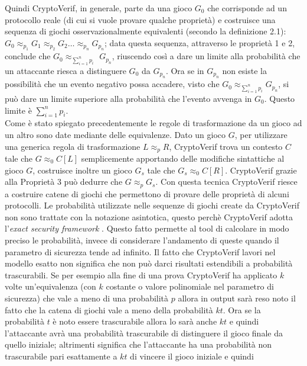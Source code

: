 \documentclass[a4paper,openright,twoside,12pt]{report}
\begin{document}
Quindi CryptoVerif, in generale, parte da una gioco $G_0$ che corrisponde ad un protocollo reale (di cui si vuole provare qualche propriet\`a) e costruisce una sequenza di giochi 
osservazionalmente equivalenti (secondo la definizione 2.1): $G_0 \approx_{p_1} G_1 \approx_{p_2} G_2 \dots \approx_{p_n} G_{p_{n}} $; data questa sequenza, 
attraverso le propriet\`a 1 e 2, conclude che $G_0  \approx_{\sum_{i=1}^{n}{p_i}}$ $G_{p_{n}} $, riuscendo cos\`i a dare un limite alla probabilit\`a che un attaccante riesca a distinguere
$G_0$ da $G_{p_{n}}$. Ora se in $G_{p_{n}}$ non esiste la possibilit\`a che un evento negativo possa accadere, visto che $G_0  \approx_{\sum_{i=1}^{n}{p_i}} G_{p_{n}} $, si pu\`o dare un limite superiore alla probabilit\`a che l'evento avvenga in $G_0$.
Questo limite \`e $\sum_{i=1}^{n}p_i$.\\Come \`e stato spiegato precedentemente le regole di trasformazione da un gioco ad un altro sono date mediante delle equivalenze. 
Dato un gioco $G$, per utilizzare una generica regola di trasformazione  $L \approx_p R$, CryptoVerif trova un contesto $C$ tale che $G \approx_0 C[L] $ semplicemente 
apportando delle modifiche sintattiche al gioco $G$, costruisce inoltre un gioco $G_s$ tale che $G_s \approx_0 C[R]$. CryptoVerif grazie alla Propriet\`a 3 pu\`o dedurre che $G \approx_p G_s$. 
Con questa tecnica CryptoVerif riesce a costruire catene
di giochi che permettono di provare delle propriet\`a di alcuni protocolli.
Le probabilit\`a utilizzate nelle sequenze di giochi create da CryptoVerif non sono trattate con la notazione asintotica, questo perch\`e
CryptoVerif adotta l'\emph{exact security framework} \cite{BellareR96}. Questo fatto permette al tool di calcolare in modo preciso le probabilit\`a, invece di 
considerare l'andamento di queste quando il parametro di sicurezza tende ad infinito.
Il fatto che CryptoVerif lavori nel modello esatto non significa che non pu\`o darci risultati estendibili a probabilit\`a trascurabili.
Se per esempio alla fine di una prova CryptoVerif ha applicato $k$ volte un'equivalenza (con $k$ costante o valore polinomiale nel parametro di sicurezza) che vale a meno di una probabilit\`a $p$ allora
in output sar\`a reso noto il fatto che la catena di giochi vale a meno della probabilit\`a $kt$. Ora se la probabilit\`a $t$ \`e noto essere
trascurabile allora lo sar\`a anche $kt$ e quindi l'attaccante avr\`a una probabilit\`a trascurabile di distinguere il gioco finale da quello iniziale; 
altrimenti significa che l'attaccante ha una probabilit\`a non trascurabile pari esattamente a $kt$ di vincere il gioco iniziale e quindi
\end{document}
